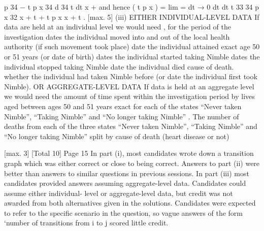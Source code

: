 \documentclass[a4paper,12pt]{article}
\begin{document}
p 34
− t p x 34
d
34
t
dt
x
+
and hence
( t p x ) = lim
=
dt → 0
dt
dt
t
33 34
p x 32 
x + t + t p x \mu x + t . 
[max. 5]
(iii)
EITHER INDIVIDUAL-LEVEL DATA
If data are held at an individual level we would need , for
the period of the investigation 
dates the individual moved into and out of the local
health authority (if such movement took place) 
date the individual attained exact age 50 or 51 years
(or date of birth) 
dates the individual started taking Nimble 
dates the individual stopped taking Nimble 
date the individual died 
cause of death. 
whether the individual had taken Nimble before (or date the
individual first took Nimble). 
OR AGGREGATE-LEVEL DATA
If data is held at an aggregate level we would need
the amount of time spent within the investigation period 
by lives aged between ages 50 and 51 years exact 
for each of the states “Never taken Nimble”, “Taking Nimble”
and “No longer taking Nimble”
. 
The number of deaths 
from each of the three states “Never taken Nimble”,
“Taking Nimble” and “No longer taking Nimble” 
split by cause of death (heart disease or not)

[max. 3]
[Total 10]
Page 15
In part (i), most candidates wrote down a transition graph which
was either correct or close to being correct. Answers to part (ii)
were better than answers to similar questions in previous sessions.
In part (iii) most candidates provided answers assuming
aggregate-level data. Candidates could assume either individual-
level or aggregate-level data, but credit was not awarded from
both alternatives given in the solutions. Candidates were expected
to refer to the specific scenario in the question, so vague answers
of the form ‘number of transitions from i to j scored little credit.
\end{document}
